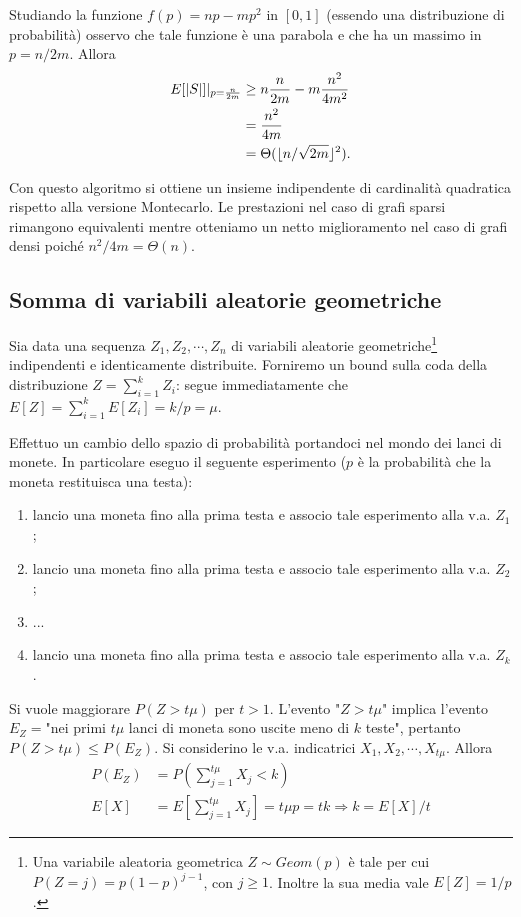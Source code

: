 Studiando la funzione $f(p)=np-mp^2$ in $[0,1]$ (essendo una distribuzione di probabilità) osservo che tale funzione è una parabola e che ha un massimo in $p=n/2m$. Allora
\begin{align*}
E[|S|]|_{p=\frac{n}{2m}} &\geq n\frac{n}{2m} -m\frac{n^2}{4m^2} \\
&=\frac{n^2}{4m} \\
&=\Theta(\lfloor n/\sqrt{2m}\rfloor^2).
\end{align*}

Con questo algoritmo si ottiene un insieme indipendente di cardinalità quadratica rispetto alla versione Montecarlo. Le prestazioni nel caso di grafi sparsi rimangono equivalenti mentre otteniamo un netto miglioramento nel caso di grafi densi poiché $n^2/4m=\Theta(n)$.

\subsection{Somma di variabili aleatorie geometriche}
Sia data una sequenza $Z_1, Z_2,\cdots, Z_n$ di variabili aleatorie geometriche\footnote{Una variabile aleatoria geometrica $Z\sim Geom(p)$ è tale per cui $P(Z=j)=p(1-p)^{j-1}$, con $j\geq 1$. Inoltre la sua media vale $E[Z]=1/p$.} indipendenti e identicamente distribuite. Forniremo un bound sulla coda della distribuzione $Z=\sum_{i=1}^kZ_i$: segue immediatamente che $E[Z]=\sum_{i=1}^kE[Z_i]=k/p=\mu$.

Effettuo un cambio dello spazio di probabilità portandoci nel mondo dei lanci di monete. In particolare eseguo il seguente esperimento ($p$ è la probabilità che la moneta restituisca una testa):
\begin{enumerate}
\item lancio una moneta fino alla prima testa e associo tale esperimento alla v.a. $Z_1$;
\item lancio una moneta fino alla prima testa e associo tale esperimento alla v.a. $Z_2$;
\item ...
\item lancio una moneta fino alla prima testa e associo tale esperimento alla v.a. $Z_k$.
\end{enumerate}

Si vuole maggiorare $P(Z>t\mu)$ per $t>1$. L'evento "$Z>t\mu$" implica l'evento $E_Z=$"nei primi $t\mu$ lanci di moneta sono uscite meno di $k$ teste", pertanto $P(Z>t\mu)\leq P(E_Z)$. Si considerino le v.a. indicatrici $X_1, X_2,\cdots, X_{t\mu}$. Allora
\begin{align*}
P(E_Z)&=P\left(\sum_{j=1}^{t\mu}X_j<k\right) \\
E[X]&=E\left[\sum_{j=1}^{t\mu}X_j\right]=t\mu p=tk \Rightarrow k=E[X]/t
\end{align*}

